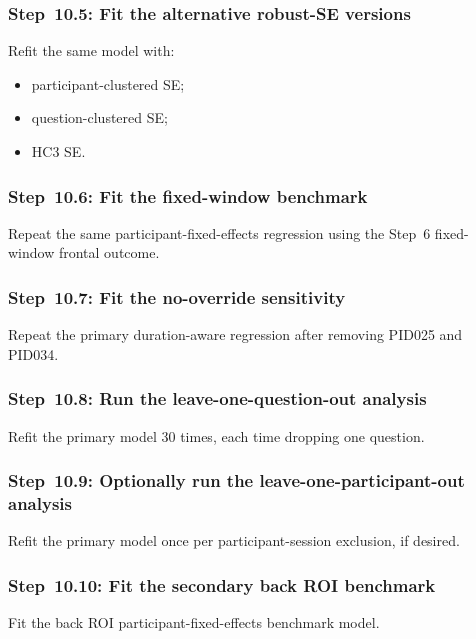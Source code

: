 \subsubsection{Step~10.5: Fit the alternative robust-SE versions}
Refit the same model with:
\begin{itemize}
    \item participant-clustered SE;
    \item question-clustered SE;
    \item HC3 SE.
\end{itemize}

\subsubsection{Step~10.6: Fit the fixed-window benchmark}
Repeat the same participant-fixed-effects regression using the Step~6 fixed-window frontal outcome.

\subsubsection{Step~10.7: Fit the no-override sensitivity}
Repeat the primary duration-aware regression after removing PID025 and PID034.

\subsubsection{Step~10.8: Run the leave-one-question-out analysis}
Refit the primary model 30 times, each time dropping one question.

\subsubsection{Step~10.9: Optionally run the leave-one-participant-out analysis}
Refit the primary model once per participant-session exclusion, if desired.

\subsubsection{Step~10.10: Fit the secondary back ROI benchmark}
Fit the back ROI participant-fixed-effects benchmark model.

